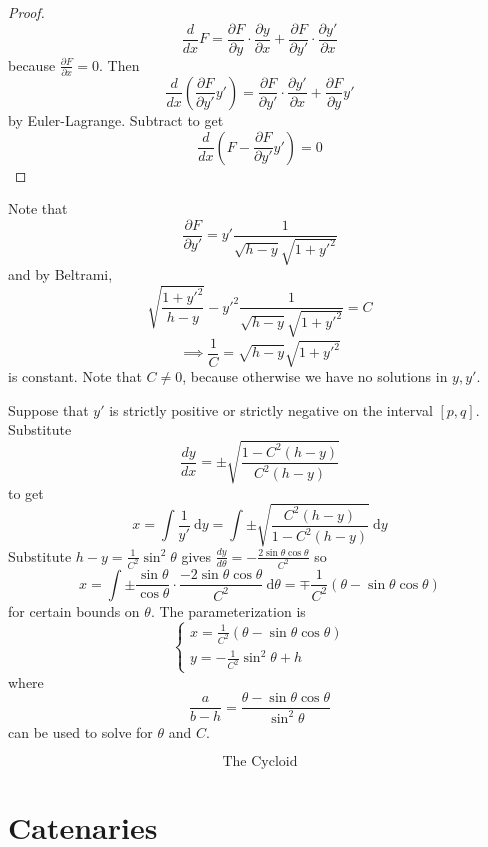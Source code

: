 \documentclass[11pt]{scrartcl}
\begin{document}
\begin{proof}
\[\frac{d}{dx} F = \frac{\partial F}{\partial y}\cdot \frac{\partial y}{\partial x} + \frac{\partial F}{\partial y'} \cdot \frac{\partial y'}{\partial x}\] because $\frac{\partial F}{\partial x} = 0$. Then \[\frac{d}{dx} \left ( \frac{\partial F}{\partial y'}y' \right ) = \frac{\partial F}{\partial y'} \cdot \frac{\partial y'}{\partial x} + \frac{\partial F}{\partial y} y' \] by Euler-Lagrange. Subtract to get \[\frac{d}{dx} \left (F - \frac{\partial F}{\partial y'} y' \right ) = 0\]
\end{proof}

Note that \[\frac{\partial F}{\partial y'} = y'\frac{1}{\sqrt{h-y} \sqrt{1 + y'^2}}\] and by Beltrami, \[\sqrt{\frac{1 + y'^2}{h-y}} - y'^2 \frac{1}{\sqrt{h-y}\sqrt{1+y'^2}} = C\] \[\implies \frac{1}{C} = \sqrt{h-y}\sqrt{1+y'^2}\] is constant. Note that $C \neq 0$, because otherwise we have no solutions in $y,y'$. 

Suppose that $y'$ is strictly positive or strictly negative on the interval $[p,q]$. Substitute \[\frac{dy}{dx} = \pm\sqrt{\frac{1-C^2(h-y)}{C^2(h-y)}}\] to get \[x = \int \frac{1}{y'} \ \mathrm dy = \int \pm \sqrt{\frac{C^2(h-y)}{1-C^2(h-y)}} \ \mathrm dy\] Substitute $h-y = \frac{1}{C^2} \sin^2 \theta$ gives $\frac{dy}{d\theta} = -\frac{2\sin\theta \cos\theta}{C^2}$ so \[x = \int \pm \frac{\sin\theta}{\cos\theta} \cdot \frac{-2\sin\theta\cos\theta}{C^2} \ \mathrm d\theta = \mp\frac{1}{C^2}(\theta - \sin\theta\cos\theta)\]
for certain bounds on $\theta$. The parameterization is \[\begin{cases}
    x = \frac{1}{C^2}(\theta - \sin\theta \cos\theta) \\ y = -\frac{1}{C^2}\sin^2\theta+h
\end{cases}\] where \[\frac{a}{b-h} = \frac{\theta - \sin\theta\cos\theta}{\sin^2\theta}\] can be used to solve for $\theta$ and $C$. 

\begin{center}
\end{center}
\[\text{The Cycloid}\]

\section{Catenaries}
\end{document}
